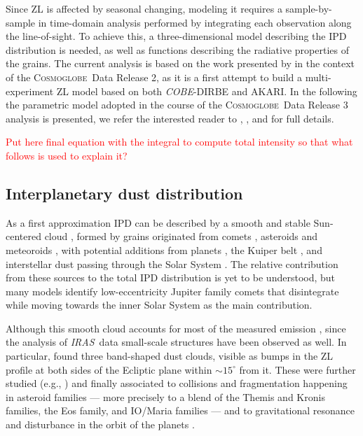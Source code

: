 \documentclass{aa}
\def\COBE{\textit{COBE}}
\def\AKARI{\textrm{{AKARI}}}
\def\IRAS{\textit{{IRAS}}}
\newcommand{\cosmoglobe}{\textsc{Cosmoglobe}}
\newcommand{\angela}[0]{\textcolor{red}}
\begin{document}
Since ZL is affected by seasonal changing, modeling it requires a sample-by-sample in 
time-domain analysis performed by integrating each observation along the line-of-sight. 
To achieve this, a three-dimensional model describing the IPD distribution 
is needed, as well as functions describing the radiative properties of the grains. 
The current analysis is based on the work presented by \citet{CG02_02} in the context 
of the \cosmoglobe\ Data Release 2, as it is a first attempt to build a multi-experiment 
ZL model based on both \COBE-DIRBE and \AKARI. In the following the parametric model 
adopted in the course of the \cosmoglobe\ Data Release 3 analysis is presented, we refer 
the interested reader to \citet{kelsall1998}, \citet{Hong}, and \citet{CG02_02} for full details.

\angela{Put here final equation with the integral to compute total intensity so that what follows 
is used to explain it?}

\subsection{Interplanetary dust distribution}

As a first approximation IPD can be described by a smooth and stable 
Sun-centered cloud \citep{Leinert1989}, formed by grains originated from comets 
\citep{Liou1995, ipatov, rigley}, asteroids \citep{Dermott1984} and meteoroids 
\citep{dikarev}, with potential additions from planets \citep{Jorgensen2021}, the 
Kuiper belt \citep{Mann2009}, and interstellar dust passing through the Solar 
System \citep{Robinson2013}. The relative contribution from these sources to 
the total IPD distribution is yet to be understood, but many models identify low-eccentricity 
Jupiter family comets that disintegrate while moving towards the inner Solar System as 
the main contribution. 

Although this smooth cloud accounts for most of the measured emission \citep{kelsall1998}, 
since the analysis of \IRAS\ data small-scale structures have been observed as well. 
In particular, \citet{Low1984} found three band-shaped dust clouds, visible as bumps 
in the ZL profile at both sides of the Ecliptic plane within $\sim15^\circ$ from it. 
These were further studied (e.g., \citet{Dermott1984, Sykes1986, Reach1997}) 
and finally associated to collisions and fragmentation happening in asteroid families --- 
more precisely to a blend of the Themis and Kronis families, the Eos family, and IO/Maria families --- 
and to gravitational resonance and disturbance in the orbit of the planets 
\citep{Low1984, Dermott1984, Dermott1994, Reach1997}.
\end{document}
